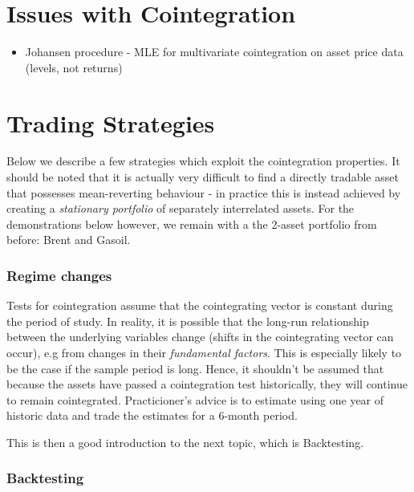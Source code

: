 \documentclass{article}
\providecommand{\tightlist}{%
      \setlength{\itemsep}{0pt}\setlength{\parskip}{0pt}}
\begin{document}
    \section{Issues with Cointegration}\label{issues-with-cointegration}

\begin{itemize}
\tightlist
\item
  Johansen procedure - MLE for multivariate cointegration on asset price
  data (levels, not returns)
\end{itemize}

    \section{Trading Strategies}\label{trading-strategies}

    Below we describe a few strategies which exploit the cointegration
properties. It should be noted that it is actually very difficult to
find a directly tradable asset that possesses mean-reverting behaviour -
in practice this is instead achieved by creating a \emph{stationary
portfolio} of separately interrelated assets. For the demonstrations
below however, we remain with a the 2-asset portfolio from before: Brent
and Gasoil.

    \subsubsection{Regime changes}\label{regime-changes}

Tests for cointegration assume that the cointegrating vector is constant
during the period of study. In reality, it is possible that the long-run
relationship between the underlying variables change (shifts in the
cointegrating vector can occur), e.g from changes in their
\emph{fundamental factors}. This is especially likely to be the case if
the sample period is long. Hence, it shouldn't be assumed that because
the assets have passed a cointegration test historically, they will
continue to remain cointegrated. Practicioner's advice is to estimate
using one year of historic data and trade the estimates for a 6-month
period.

This is then a good introduction to the next topic, which is
Backtesting.

    \subsubsection{Backtesting}\label{backtesting}
\end{document}
